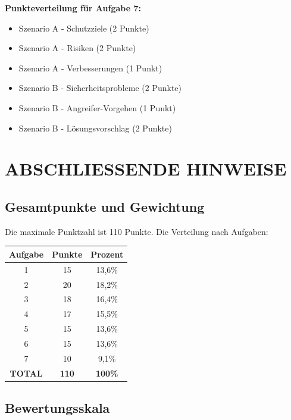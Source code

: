 \documentclass[12pt,a4paper]{article}
\begin{document}
\textbf{Punkteverteilung für Aufgabe 7:}
\begin{itemize}
    \item Szenario A - Schutzziele (2 Punkte) \checkmark
    \item Szenario A - Risiken (2 Punkte) \checkmark
    \item Szenario A - Verbesserungen (1 Punkt) \checkmark
    \item Szenario B - Sicherheitsprobleme (2 Punkte) \checkmark
    \item Szenario B - Angreifer-Vorgehen (1 Punkt) \checkmark
    \item Szenario B - Lösungsvorschlag (2 Punkte) \checkmark
\end{itemize}


\newpage

\section*{ABSCHLIESSENDE HINWEISE}

\subsection*{Gesamtpunkte und Gewichtung}

Die maximale Punktzahl ist 110 Punkte. Die Verteilung nach Aufgaben:

\centering
\begin{tabular}{|c|c|c|}
    \hline
    \textbf{Aufgabe} & \textbf{Punkte} & \textbf{Prozent} \\
    \hline
    1 & 15 & 13,6\% \\
    2 & 20 & 18,2\% \\
    3 & 18 & 16,4\% \\
    4 & 17 & 15,5\% \\
    5 & 15 & 13,6\% \\
    6 & 15 & 13,6\% \\
    7 & 10 & 9,1\% \\
    \hline
    \textbf{TOTAL} & \textbf{110} & \textbf{100\%} \\
    \hline
\end{tabular}

\subsection*{Bewertungsskala}
\end{document}
